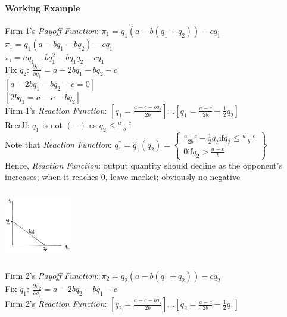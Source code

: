 \documentclass[11pt, english]{article}
\begin{document}
		\paragraph{Working Example}

	Firm 1's \textit{Payoff Function}: $\pi_1=q_1(a-b(q_1+q_2))-cq_1$\\
	$\pi_1=q_1(a-bq_1-bq_2)-cq_1$\\
	$\pi_i=aq_1-bq_1^2-bq_1q_2-cq_1$\\

	Fix $q_2$: $\frac{\partial\pi_1}{\partial q_1}=a-2bq_1-bq_2-c$\\
	$[a-2bq_1-bq_2-c=0]$\\
	$[2bq_1=a-c-bq_2]$\\

	Firm 1's \textit{Reaction Function}: $[q_1=\frac{a-c-bq_2}{2b}]...[q_1=\frac{a-c}{2b}-\frac{1}{2}q_2]$\\
	Recall: $q_1$ is not $(-)$ as $q_2\le\frac{a-c}{b}$\\

	Note that \textit{Reaction Function}: $q_1^*=\hat{q}_1(q_2)=\begin{Bmatrix}\frac{a-c}{2b}-\frac{1}{2}q_2\mathrm{if}q_2\le\frac{a-c}{b}\\0\mathrm{if}q_2>\frac{a-c}{b}\end{Bmatrix}$\\

	Hence, \textit{Reaction Function}: output quantity should decline as the opponent's increases; when it reaches 0, leave market; obviously no negative

	\begin{center}
		\includegraphics[width=3cm,height=3cm]{EC315-IMG/16.png}
	\end{center}

	Firm 2's \textit{Payoff Function}: $\pi_2=q_2(a-b(q_1+q_2))-cq_2$\\
	Fix $q_1$: $\frac{\partial\pi_2}{\partial q_2}=a-2bq_2-bq_1-c$\\
	Firm 2's \textit{Reaction Function}: $[q_2=\frac{a-c-bq_1}{2b}]...[q_2=\frac{a-c}{2b}-\frac{1}{2}q_1]$\\
\end{document}
